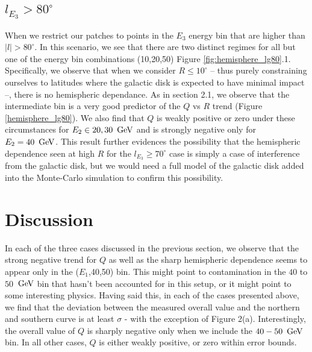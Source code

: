 \documentclass[english]{article}
\newcommand{\GeV}{\,{\rm GeV}}
\begin{document}
\subsection{$l_{E_3} > 80^{\circ}$}
When we restrict our patches to points in the $E_{3}$ energy bin that are higher
than $|l| > 80^{\circ}$.
In this scenario, we see that there are two distinct regimes for all but one of
the energy bin combinations (10,20,50) Figure \ref{fig:hemisphere_lg80}.1.
Specifically, we observe that when we consider $R\leq10^{\circ}$ -- thus 
purely constraining ourselves to latitudes where the galactic disk is
expected to have minimal impact --, there is no hemispheric dependance.
As in section 2.1, we observe that the intermediate bin is a very good
predictor of the $Q$ vs $R$ trend (Figure \ref{hemisphere_lg80}).
We also find that $Q$ is weakly positive or zero under these circumstances
for $E_{2}\in{20,30}\ \GeV$ and is strongly negative only for 
$E_2=40\ \GeV$.
This result further evidences the possibility that the hemispheric dependence
seen at high $R$ for the $l_{E_3}\geq70^{\circ}$ case is simply a case
of interference from the galactic disk, but we would need a full model of 
the galactic disk added into the Monte-Carlo simulation to confirm this
possibility.

\section{Discussion}
In each of the three cases discussed in the previous section, we observe that
the strong negative trend for $Q$ as well as the sharp hemispheric dependence
seems to appear only in the ($E_1$,40,50) bin. 
This might point to contamination in the $40$ to $50$ $\GeV$ bin that hasn't 
been accounted for in this setup, or it might point to some interesting 
physics.
Having said this, in each of the cases presented above, we find that the 
deviation between the measured overall value and the northern and southern
curve is at least $\sigma$ - with the exception of Figure 2(a).
Interestingly, the overall value of $Q$ is sharply negative only when we 
include the $40-50\ \GeV$ bin.
In all other cases, $Q$ is either weakly positive, or zero within error bounds.
\end{document}
